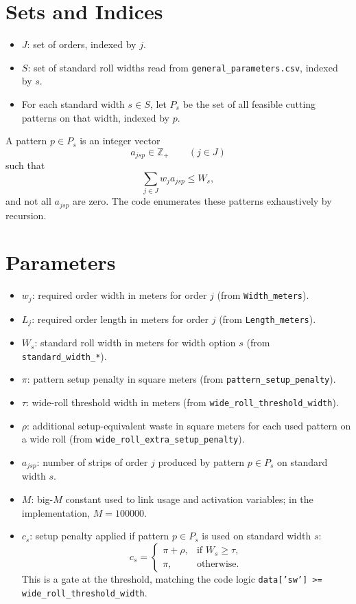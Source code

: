 \section*{Sets and Indices}

\begin{itemize}
\item $J$: set of orders, indexed by $j$.
\item $S$: set of standard roll widths read from \texttt{general\_parameters.csv}, indexed by $s$.
\item For each standard width $s \in S$, let $P_s$ be the set of all feasible cutting patterns on that width, indexed by $p$.
\end{itemize}

A pattern $p \in P_s$ is an integer vector
\[
a_{jsp} \in \mathbb{Z}_{+} \qquad (j \in J)
\]
such that
\[
\sum_{j \in J} w_j a_{jsp} \le W_s,
\]
and not all $a_{jsp}$ are zero. The code enumerates these patterns exhaustively by recursion.

\section*{Parameters}

\begin{itemize}
\item $w_j$: required order width in meters for order $j$ (from \texttt{Width\_meters}).
\item $L_j$: required order length in meters for order $j$ (from \texttt{Length\_meters}).
\item $W_s$: standard roll width in meters for width option $s$ (from \texttt{standard\_width\_*}).
\item $\pi$: pattern setup penalty in square meters (from \texttt{pattern\_setup\_penalty}).
\item $\tau$: wide-roll threshold width in meters (from \texttt{wide\_roll\_threshold\_width}).
\item $\rho$: additional setup-equivalent waste in square meters for each used pattern on a wide roll (from \texttt{wide\_roll\_extra\_setup\_penalty}).
\item $a_{jsp}$: number of strips of order $j$ produced by pattern $p \in P_s$ on standard width $s$.
\item $M$: big-$M$ constant used to link usage and activation variables; in the implementation, $M=100000$.
\item $c_s$: setup penalty applied if pattern $p \in P_s$ is used on standard width $s$:
\[
c_s =
\begin{cases}
\pi + \rho, & \text{if } W_s \ge \tau,\\
\pi, & \text{otherwise.}
\end{cases}
\]
This is a gate at the threshold, matching the code logic \texttt{data['sw'] >= wide\_roll\_threshold\_width}.
\end{itemize}

